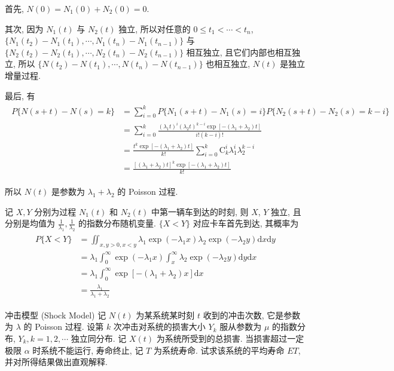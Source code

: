 \documentclass[boxes]{homework}
\begin{document}
\begin{solution}
    首先, $N(0)=N_1(0)+N_2(0)=0$.

    其次, 因为 $N_1(t)$ 与 $N_2(t)$ 独立, 所以对任意的 $0\leq t_1<\cdots<t_n$, $\{N_1(t_2) - N_1(t_1),\cdots,N_1(t_n)-N_1(t_{n-1})\}$ 与 $\{N_2(t_2) - N_2(t_1),\cdots,N_2(t_n)-N_2(t_{n-1})\}$ 相互独立, 且它们内部也相互独立, 所以 $\{N(t_2) - N(t_1),\cdots,N(t_n)-N(t_{n-1})\}$ 也相互独立, $N(t)$ 是独立增量过程.

    最后, 有\vspace*{-1em}
    \begin{align}
        \begin{aligned}
            P\{N(s+t) - N(s)=k\} &= \sum_{i = 0}^k P\{N_1(s+t) - N_1(s)=i\}P\{N_2(s+t) - N_2(s)=k-i\}\\
            &= \sum_{i = 0}^k \frac{(\lambda_1t)^i(\lambda_2t)^{k-i}\exp[-(\lambda_1+\lambda_2)t]}{i!(k-i)!}\\
            &= \frac{t^k\exp[-(\lambda_1+\lambda_2)t]}{k!}\sum_{i = 0}^k \mathrm{C}_k^i\lambda_1^i\lambda_2^{k-i}\\
            &= \frac{[(\lambda_1 + \lambda_2)t]^k\exp[-(\lambda_1+\lambda_2)t]}{k!}
        \end{aligned}
    \end{align}
    
    所以 $N(t)$ 是参数为 $\lambda_1+\lambda_2$ 的 Poisson 过程.

    记 $X, Y$ 分别为过程 $N_1(t)$ 和 $N_2(t)$ 中第一辆车到达的时刻, 则 $X$, $Y$ 独立, 且分别是均值为 $\displaystyle \frac{1}{\lambda_1},\frac{1}{\lambda_2}$ 的指数分布随机变量. $\{X<Y\}$ 对应卡车首先到达, 其概率为 
    \begin{align}
        \begin{aligned}
            P\{X<Y\}&=\iint_{x,y>0, x<y}\lambda_1\exp(-\lambda_1x)\lambda_2\exp(-\lambda_2y)\mathrm{d}x\mathrm{d}y\\
            &=\lambda_1\int_{0}^\infty\exp(-\lambda_1x)\int_x^\infty\lambda_2\exp(-\lambda_2y)\mathrm{d}y\mathrm{d}x\\
            &=\lambda_1\int_0^\infty\exp[-(\lambda_1+\lambda_2)x]\mathrm{d}x\\
            &=\frac{\lambda_1}{\lambda_1+\lambda_2}
        \end{aligned}
    \end{align}
\end{solution}
\begin{problem}
    冲击模型 (Shock Model) \quad 记 $N(t)$ 为某系统某时刻 $t$ 收到的冲击次数, 它是参数为 $\lambda$ 的 Poisson 过程. 设第 $k$ 次冲击对系统的损害大小 $Y_k$ 服从参数为 $\mu$ 的指数分布, $Y_k, k=1,2,\cdots$ 独立同分布. 记 $X(t)$ 为系统所受到的总损害. 当损害超过一定极限 $\alpha$ 时系统不能运行, 寿命终止, 记 $T$ 为系统寿命. 试求该系统的平均寿命 $ET$, 并对所得结果做出直观解释.
\end{problem}
\end{document}
